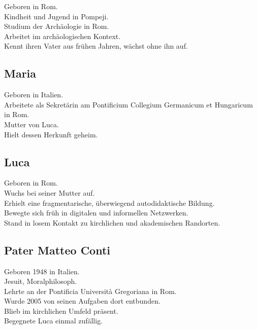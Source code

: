 \documentclass[
]{article}
\begin{document}
Geboren in Rom.\\
Kindheit und Jugend in Pompeji.\\
Studium der Archäologie in Rom.\\
Arbeitet im archäologischen Kontext.\\
Kennt ihren Vater aus frühen Jahren, wächst ohne ihn auf.

\subsubsection{\texorpdfstring{\hfill\break
}{ }}\label{section}

\subsection{Maria}\label{maria}

Geboren in Italien.\\
Arbeitete als Sekretärin am Pontificium Collegium Germanicum et Hungaricum in Rom.\\
Mutter von Luca.\\
Hielt dessen Herkunft geheim.

\subsection{Luca}\label{luca}

Geboren in Rom.\\
Wuchs bei seiner Mutter auf.\\
Erhielt eine fragmentarische, überwiegend autodidaktische Bildung.\\
Bewegte sich früh in digitalen und informellen Netzwerken.\\
Stand in losem Kontakt zu kirchlichen und akademischen Randorten.

\subsection{Pater Matteo Conti}\label{pater-matteo-conti}

Geboren 1948 in Italien.\\
Jesuit, Moralphilosoph.\\
Lehrte an der Pontificia Università Gregoriana in Rom.\\
Wurde 2005 von seinen Aufgaben dort entbunden.\\
Blieb im kirchlichen Umfeld präsent.\\
Begegnete Luca einmal zufällig.
\end{document}
